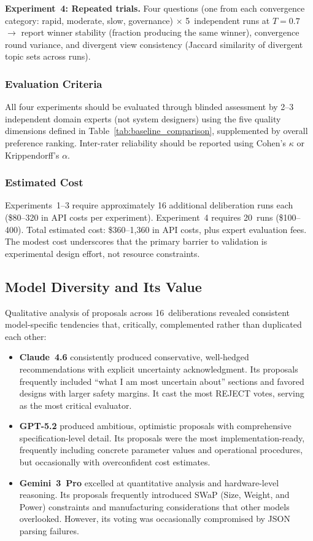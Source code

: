 \documentclass[11pt,a4paper]{article}
\begin{document}
\textbf{Experiment~4: Repeated trials.} Four questions (one from each convergence category: rapid, moderate, slow, governance) $\times$ 5~independent runs at $T=0.7$ $\rightarrow$ report winner stability (fraction producing the same winner), convergence round variance, and divergent view consistency (Jaccard similarity of divergent topic sets across runs).

\subsubsection{Evaluation Criteria}

All four experiments should be evaluated through blinded assessment by 2--3 independent domain experts (not system designers) using the five quality dimensions defined in Table~\ref{tab:baseline_comparison}, supplemented by overall preference ranking. Inter-rater reliability should be reported using Cohen's $\kappa$ or Krippendorff's $\alpha$.

\subsubsection{Estimated Cost}

Experiments~1--3 require approximately 16 additional deliberation runs each (\$80--320 in API costs per experiment). Experiment~4 requires 20~runs (\$100--400). Total estimated cost: \$360--1{,}360 in API costs, plus expert evaluation fees. The modest cost underscores that the primary barrier to validation is experimental design effort, not resource constraints.

\subsection{Model Diversity and Its Value}

Qualitative analysis of proposals across 16~deliberations revealed consistent model-specific tendencies that, critically, complemented rather than duplicated each other:

\begin{itemize}[nosep]
    \item \textbf{Claude~4.6} consistently produced conservative, well-hedged recommendations with explicit uncertainty acknowledgment. Its proposals frequently included ``what I am most uncertain about'' sections and favored designs with larger safety margins. It cast the most REJECT votes, serving as the most critical evaluator.
    \item \textbf{GPT-5.2} produced ambitious, optimistic proposals with comprehensive specification-level detail. Its proposals were the most implementation-ready, frequently including concrete parameter values and operational procedures, but occasionally with overconfident cost estimates.
    \item \textbf{Gemini~3~Pro} excelled at quantitative analysis and hardware-level reasoning. Its proposals frequently introduced SWaP (Size, Weight, and Power) constraints and manufacturing considerations that other models overlooked. However, its voting was occasionally compromised by JSON parsing failures.
\end{itemize}
\end{document}
